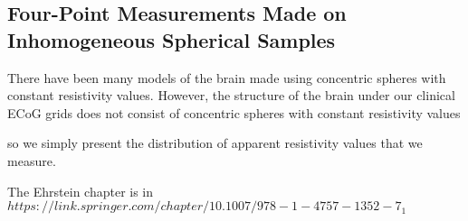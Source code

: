 \subsection{Four-Point Measurements Made on Inhomogeneous Spherical Samples}

There have been many models of the brain made using concentric spheres with constant resistivity values. However, the structure of the brain under our clinical ECoG grids does not consist of concentric spheres with constant resistivity values

so we simply present the distribution of apparent resistivity values that we measure.

The Ehrstein chapter is in $ https://link.springer.com/chapter/10.1007/978-1-4757-1352-7_1 $
%

